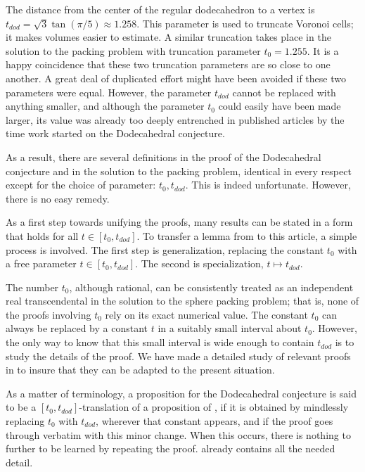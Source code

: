 The distance from the center of the regular dodecahedron to a vertex is
$t_{dod}=\sqrt{3}\tan(\pi/5)\approx 1.258$.   This parameter is used to truncate
Voronoi cells; it makes  volumes easier to estimate.  A similar truncation
takes place in the solution to the packing problem with truncation parameter
$t_0 = 1.255$.  It is a happy coincidence that these two truncation parameters 
are so close to one another.  
A great deal of duplicated effort
might have been avoided if these two parameters were equal.  However, the parameter
$t_{dod}$ cannot be replaced with anything smaller, 
and although the parameter $t_0$ could 
easily have been made larger, 
its value was already too deeply entrenched in published articles 
by the time  work started
on the Dodecahedral conjecture.  

As a result, there are several definitions in the proof of the Dodecahedral conjecture
and in the solution to the packing problem, identical in every respect except
for the choice of parameter: $t_0,t_{dod}$.  This is indeed unfortunate.  However,
there is no easy remedy. 



 As a first step towards unifying the proofs,
 many results can be stated in a form that holds for all $t\in[t_0,t_{dod}]$.
To transfer a lemma from \cite{DCG} to this article, a simple process is
involved.  The first step is generalization, replacing the constant $t_0$
with a free parameter $t\in[t_0,t_{dod}]$.  The second is specialization,
$t\mapsto t_{dod}$.  

The number $t_0$, although rational, 
can be consistently treated as an independent real transcendental 
in the solution to the sphere packing problem; that is,
none of the proofs involving $t_0$ rely on its exact numerical value.
The constant $t_0$ can always be replaced by a constant $t$
in a suitably small interval about $t_0$.  However, the only way to
know that this small interval is wide enough to contain $t_{dod}$ is to study the
details of the proof.  We have made 
a detailed study of relevant proofs in \cite{DCG} to insure that
they can be adapted to the present situation.

As a matter of terminology, a proposition for the Dodecahedral conjecture
is said to be a $[t_0,t_{dod}]$-translation of a proposition of \cite{DCG},
if it is obtained by mindlessly replacing $t_0$ with $t_{dod}$, wherever that constant appears, and if the proof goes through verbatim with this minor change.
When this occurs, 
there is nothing to further to be learned by repeating the proof.
 \cite{DCG} already contains all the needed detail.

